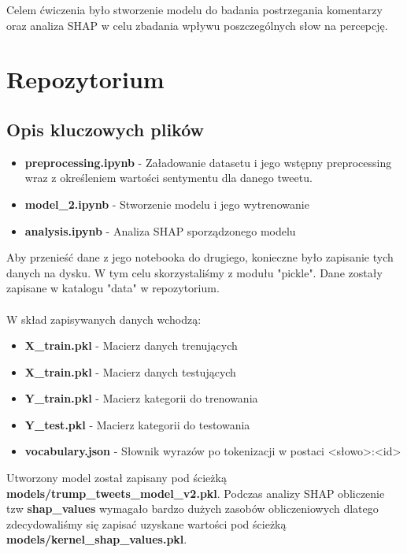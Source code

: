 \documentclass{article}
\begin{document}
Celem ćwiczenia było stworzenie modelu do badania postrzegania komentarzy oraz analiza SHAP w celu zbadania wpływu poszczególnych słow na percepcję. 




\section{Repozytorium}

\href{https://github.com/Critteros/trump-tweets}{\color{blue}{GitHub}}

\subsection{Opis kluczowych plików}

\begin{itemize}
    \item \textbf{preprocessing.ipynb} - Załadowanie datasetu i jego wstępny preprocessing wraz z określeniem wartości sentymentu dla danego tweetu.
    \item \textbf{model\_2.ipynb} - Stworzenie modelu i jego wytrenowanie
    \item \textbf{analysis.ipynb} - Analiza SHAP sporządzonego modelu
\end{itemize}


\noindent Aby przenieść dane z jego notebooka do drugiego, konieczne było zapisanie tych danych na dysku. W tym celu skorzystaliśmy z modułu "pickle". Dane zostały zapisane w katalogu "data" w repozytorium.
\\
\\
\noindent W skład zapisywanych danych wchodzą:
\begin{itemize}
    \item \textbf{X\_train.pkl} - Macierz danych trenujących
    \item \textbf{X\_train.pkl} - Macierz danych testujących
    \item \textbf{Y\_train.pkl} - Macierz kategorii do trenowania
    \item \textbf{Y\_test.pkl} - Macierz kategorii do testowania
    \item \textbf{vocabulary.json} - Słownik wyrazów po tokenizacji w postaci \textless słowo\textgreater:\textless id\textgreater
\end{itemize}

Utworzony model został zapisany pod ścieżką \textbf{models/trump\_tweets\_model\_v2.pkl}. Podczas analizy SHAP obliczenie tzw \textbf{shap\_values} wymagało bardzo dużych
zasobów obliczeniowych dlatego zdecydowaliśmy się zapisać uzyskane wartości pod ścieżką \textbf{models/kernel\_shap\_values.pkl}.
\end{document}
